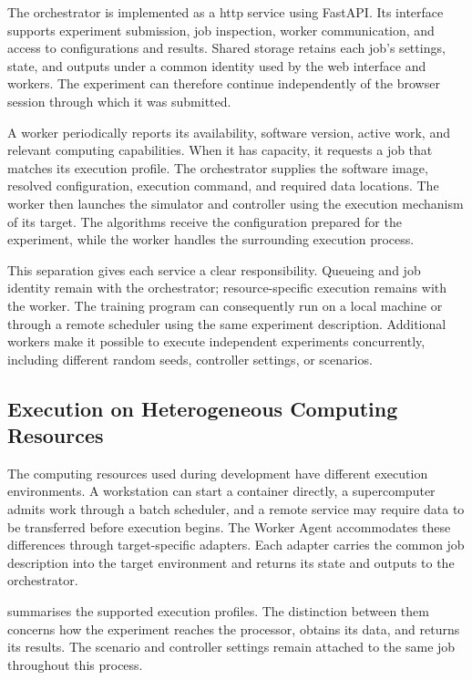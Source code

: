 The orchestrator is implemented as a \gls{http} service using FastAPI. Its interface supports experiment submission, job inspection, worker communication, and access to configurations and results. Shared storage retains each job's settings, state, and outputs under a common identity used by the web interface and workers. The experiment can therefore continue independently of the browser session through which it was submitted.

A worker periodically reports its availability, software version, active work, and relevant computing capabilities. When it has capacity, it requests a job that matches its execution profile. The orchestrator supplies the software image, resolved configuration, execution command, and required data locations. The worker then launches the simulator and controller using the execution mechanism of its target. The algorithms receive the configuration prepared for the experiment, while the worker handles the surrounding execution process.

This separation gives each service a clear responsibility. Queueing and job identity remain with the orchestrator; resource-specific execution remains with the worker. The training program can consequently run on a local machine or through a remote scheduler using the same experiment description. Additional workers make it possible to execute independent experiments concurrently, including different random seeds, controller settings, or scenarios.

\subsection{Execution on Heterogeneous Computing Resources}
\label{sec:energaize-compute}

The computing resources used during development have different execution environments. A workstation can start a container directly, a supercomputer admits work through a batch scheduler, and a remote service may require data to be transferred before execution begins. The Worker Agent accommodates these differences through target-specific adapters. Each adapter carries the common job description into the target environment and returns its state and outputs to the orchestrator.

 summarises the supported execution profiles. The distinction between them concerns how the experiment reaches the processor, obtains its data, and returns its results. The scenario and controller settings remain attached to the same job throughout this process.

